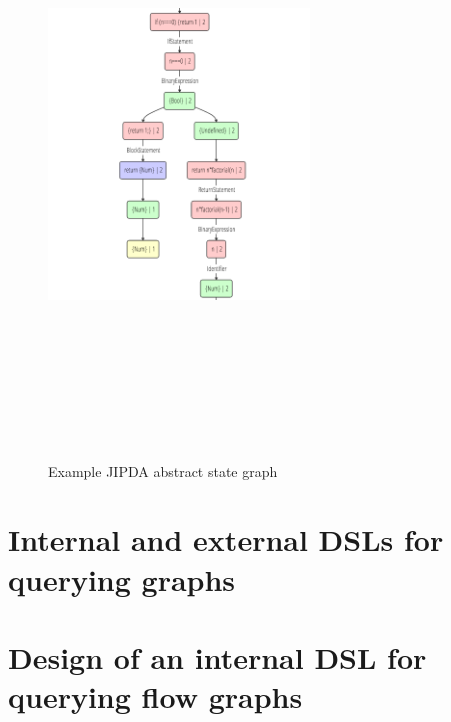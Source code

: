 \begin{figure}
    \centering
      \includegraphics[width=262px, height=606px, keepaspectratio]{images/JipdaGraph} 
      \caption{Example JIPDA abstract state graph}
    \label{fig:JipdaGraph}
\end{figure}

\section{Internal and external DSLs for querying graphs}
\section{Design of an internal DSL for querying flow graphs}


